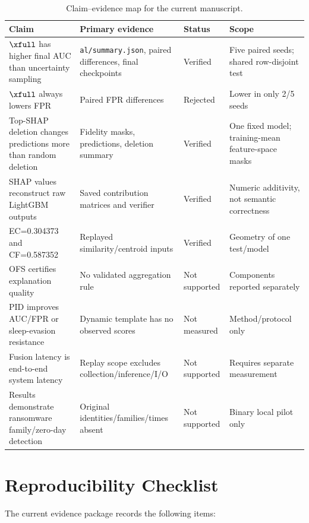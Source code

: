 \begin{table}[h]
\centering
\caption{Claim--evidence map for the current manuscript.}
\label{tab:claim-evidence}
\scriptsize
\setlength{\tabcolsep}{3pt}
\begin{tabular}{p{4.9cm}p{4.5cm}p{1.8cm}p{3.0cm}}
\toprule
Claim & Primary evidence & Status & Scope \\
\midrule
$\xfull$ has higher final AUC than uncertainty sampling & \texttt{al/summary.json}, paired differences, final checkpoints & Verified & Five paired seeds; shared row-disjoint test \\
$\xfull$ always lowers FPR & Paired FPR differences & Rejected & Lower in only 2/5 seeds \\
Top-SHAP deletion changes predictions more than random deletion & Fidelity masks, predictions, deletion summary & Verified & One fixed model; training-mean feature-space masks \\
SHAP values reconstruct raw LightGBM outputs & Saved contribution matrices and verifier & Verified & Numeric additivity, not semantic correctness \\
EC=0.304373 and CF=0.587352 & Replayed similarity/centroid inputs & Verified & Geometry of one test/model \\
OFS certifies explanation quality & No validated aggregation rule & Not supported & Components reported separately \\
PID improves AUC/FPR or sleep-evasion resistance & Dynamic template has no observed scores & Not measured & Method/protocol only \\
Fusion latency is end-to-end system latency & Replay scope excludes collection/inference/I/O & Not supported & Requires separate measurement \\
Results demonstrate ransomware family/zero-day detection & Original identities/families/times absent & Not supported & Binary local pilot only \\
\bottomrule
\end{tabular}
\end{table}

\section{Reproducibility Checklist}

The current evidence package records the following items:


